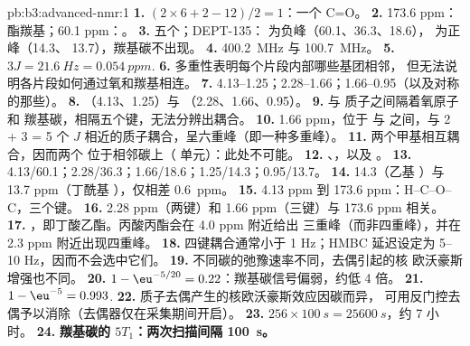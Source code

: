 \begin{solution}{pb:b3:advanced-nmr:1}
\textbf{1.} $(2 \times 6 + 2 - 12)/2 = 1$：一个 C=O。
\textbf{2.} 173.6 ppm：酯羰基；60.1 ppm：。
\textbf{3.} 五个；DEPT-135： 为负峰（60.1、36.3、18.6）， 为正峰（14.3、
13.7），羰基碳不出现。
\textbf{4.} \qty{400.2}{MHz} 与 \qty{100.7}{MHz}。
\textbf{5.} $3J = \qty{21.6}{Hz} = \qty{0.054}{ppm}$.
\textbf{6.} 多重性表明每个片段内部哪些基团相邻，
但无法说明各片段如何通过氧和羰基相连。
\textbf{7.} 4.13--1.25；2.28--1.66；1.66--0.95（以及对称的那些）。
\textbf{8.} （4.13、1.25）与 （2.28、1.66、0.95）。
\textbf{9.}  与  质子之间隔着氧原子和
羰基碳，相隔五个键，无法分辨出耦合。
\textbf{10.} 1.66 ppm，位于  与  之间，与 2 + 3 = 5 个
$J$ 相近的质子耦合，呈六重峰（即一种多重峰）。
\textbf{11.} 两个甲基相互耦合，因而两个  位于相邻碳上（ 单元）：此处不可能。
\textbf{12.} 、，以及 。
\textbf{13.} 4.13/60.1；2.28/36.3；1.66/18.6；1.25/14.3；0.95/13.7。
\textbf{14.} 14.3（乙基 ）与 13.7 ppm（丁酰基 ），仅相差 \qty{0.6}{ppm}。
\textbf{15.} 4.13 ppm 到 173.6 ppm：H--C--O--C，三个键。
\textbf{16.} 2.28 ppm（两键）和 1.66 ppm（三键）与 173.6 ppm 相关。
\textbf{17.} ，即丁酸乙酯。丙酸丙酯会在 4.0 ppm 附近给出
 三重峰（而非四重峰），并在 2.3 ppm 附近出现四重峰。
\textbf{18.} 四键耦合通常小于 1 Hz；HMBC 延迟设定为
5--10 Hz，因而不会选中它们。
\textbf{19.} 不同碳的弛豫速率不同，去偶引起的核
欧沃豪斯增强也不同。
\textbf{20.} $1 - \eu^{-5/20} = 0.22$：羰基碳信号偏弱，约低 4 倍。
\textbf{21.} $1 - \eu^{-5} = 0.993$.
\textbf{22.} 质子去偶产生的核欧沃豪斯效应因碳而异，
可用反门控去偶予以消除（去偶器仅在采集期间开启）。
\textbf{23.} $256 \times \qty{100}{s} = \qty{25600}{s}$，约 7 小时。
\textbf{24.} \textbf{羰基碳的 $5T_1$：两次扫描间隔 \qty{100}{s}。}
\end{solution}
